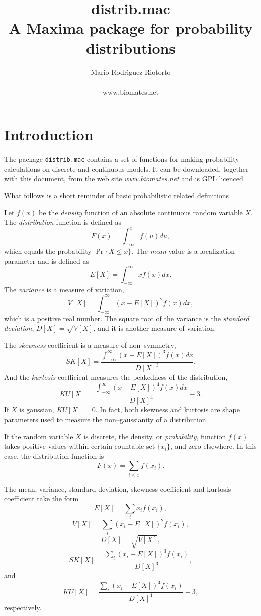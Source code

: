 \documentclass[12pt,a4paper]{article}
\title{\textbf{\Huge{distrib.mac}\\
                       \large{A Maxima package for probability distributions}}}
\author{\Large{Mario Rodr\'{\i}guez Riotorto}\\
	  \\
	  www.biomates.net\\
	  }
\begin{document}
\maketitle
\tableofcontents

\section{Introduction}

The package \verb|distrib.mac| contains a set of functions for making probability calculations on discrete and continuous models. It can be downloaded, together with this document, from the web site \emph{www.biomates.net} and is GPL licenced.

What follows is a short reminder of basic probabilistic related definitions.

Let $f(x)$ be the \emph{density} function of an absolute continuous random variable $X$. The \emph{distribution} function is defined as
\[
F(x)=\int_{-\infty}^x f(u) du,
\]
which equals the probability $\Pr\{X \leq x\}$. The \emph{mean} value is a localization parameter and is defined as
\[
E[X]=\int_{-\infty}^{\infty} x f(x) dx.
\]
The \emph{variance} is a measure of variation,
\[
V[X]=\int_{-\infty}^{\infty} (x-E[X])^2 f(x) dx,
\]
which is a positive real number. The square root of the variance is the \emph{standard deviation}, $D[X]=\sqrt{V[X]}$, and it is another measure of variation.

The \emph{skewness} coefficient is a measure of non--symmetry,
\[
SK[X]=\frac{\int_{-\infty}^{\infty} (x-E[X])^3 f(x) dx}{D[X]^3}.
\] 
And the \emph{kurtosis} coefficient measures the peakedness of the distribution,
\[
KU[X]=\frac{\int_{-\infty}^{\infty} (x-E[X])^4 f(x) dx}{D[X]^4}-3.
\]
If $X$ is gaussian, $KU[X]=0$. In fact, both skewness and kurtosis are shape parameters used to measure the non--gaussianity of a distribution.

If the random variable $X$ is discrete, the density, or \emph{probability}, function $f(x)$ takes positive values within certain countable set $\{x_i\}$, and zero elsewhere. In this case, the distribution function is
\[
F(x)=\sum_{i \leq x} f(x_i).
\]

The mean, variance, standard deviation, skewness coefficient and kurtosis coefficient take the form
\[
E[X]= \sum_i x_i f(x_i),
\]
\[
V[X]= \sum_i (x_i-E[X])^2 f(x_i),
\]
\[
D[X]=\sqrt{V[X]},
\]
\[
SK[X]=\frac{\sum_i (x_i-E[X])^3 f(x_i)}{D[X]^3},
\]
and
\[
KU[X]=\frac{\sum_i (x_i-E[X])^4 f(x_i)}{D[X]^4}-3,
\]
respectively.
\end{document}
